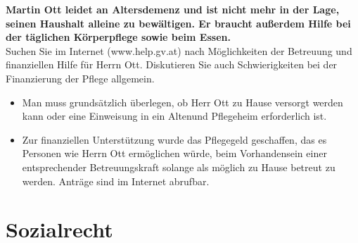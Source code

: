 		\textbf{Martin Ott leidet an Altersdemenz und ist nicht mehr in der Lage, seinen Haushalt alleine zu bewältigen.
			Er braucht außerdem Hilfe bei der täglichen Körperpflege sowie beim Essen. }\\
		Suchen Sie im Internet (www.help.gv.at) nach Möglichkeiten der Betreuung und finanziellen Hilfe für Herrn Ott.
		Diskutieren Sie auch Schwierigkeiten bei der Finanzierung der Pflege allgemein. \\
		
		\begin{itemize}
			\item Man muss grundsätzlich überlegen, ob Herr Ott zu Hause versorgt werden kann oder eine Einweisung in ein Altenund
			Pflegeheim erforderlich ist.
			\item Zur finanziellen Unterstützung wurde das Pflegegeld geschaffen, das es Personen wie Herrn Ott ermöglichen würde,
			beim Vorhandensein einer entsprechender Betreuungskraft solange als möglich zu Hause betreut zu werden. Anträge
			sind im Internet abrufbar.
		\end{itemize}

		
\section{Sozialrecht}